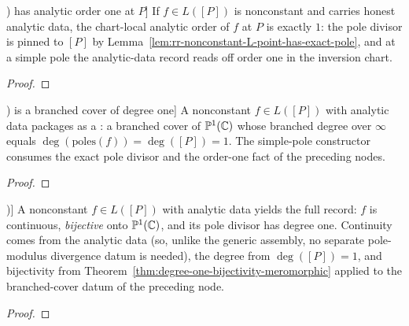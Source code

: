 \begin{lemma}[A nonconstant element of \(L([P])\) has analytic order one at \(P\)]
\label{lem:rr-nonconstant-L-point-order-one}
If \(f\in L([P])\) is nonconstant and carries honest analytic data, the
chart-local analytic order of \(f\) at \(P\) is exactly \(1\): the pole divisor
is pinned to \([P]\) by
Lemma~\ref{lem:rr-nonconstant-L-point-has-exact-pole}, and at a simple pole the
analytic-data record reads off order one in the inversion chart.
\leanok
\end{lemma}
\begin{proof}\leanok\end{proof}

\begin{lemma}[A nonconstant element of \(L([P])\) is a branched cover of degree one]
\label{lem:rr-nonconstant-L-point-branched-cover-datum}
A nonconstant \(f\in L([P])\) with analytic data packages as a
: a branched cover of \(\mathbb{P}^{1}(\mathbb{C})\) whose
branched degree over \(\infty\) equals
\(\deg(\mathrm{poles}(f))=\deg([P])=1\). The simple-pole constructor consumes
the exact pole divisor and the order-one fact of the preceding nodes.
\leanok
\end{lemma}
\begin{proof}\leanok\end{proof}

\begin{lemma}[Degree-one bijectivity package for a nonconstant element of \(L([P])\)]
\label{lem:rr-nonconstant-L-point-degree-one-package}
A nonconstant \(f\in L([P])\) with analytic data yields the full
 record: \(f\) is continuous, \emph{bijective}
onto \(\mathbb{P}^{1}(\mathbb{C})\), and its pole divisor has degree one. Continuity comes from the
analytic data (so, unlike the generic assembly, no separate pole-modulus
divergence datum is needed), the degree from \(\deg([P])=1\), and bijectivity
from Theorem~\ref{thm:degree-one-bijectivity-meromorphic} applied to the
branched-cover datum of the preceding node.
\leanok
\end{lemma}
\begin{proof}\leanok\end{proof}

